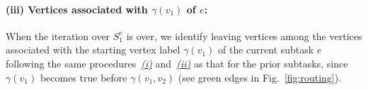 \documentclass[Afour,sageh,times]{sagej}
\newcommand{\clause}[1]{\mathsf{cls}(#1)}
\newcommand{\ag}[2]{\langle#1,#2\rangle}
\renewcommand{\ap}[3]{\mathcal{\pi}_{{#1},{#2}}^{#3}}
\begin{document}

\paragraph{(iii) Vertices associated with $\gamma(v_1)$ of $e$:}\label{sec:c} When the iteration over $S_1^e$ is over, we identify leaving vertices  among the vertices associated with the starting vertex label  $\gamma(v_1)$ of the current subtask $e$ following the same procedures~\hyperref[sec:a]{\it (i)} and~\hyperref[sec:b]{\it (ii)} as that for the prior subtasks, since $\gamma(v_1)$  becomes true before $\gamma(v_1, v_2)$ (see green edges in Fig.~\ref{fig:routing}).
\end{document}
